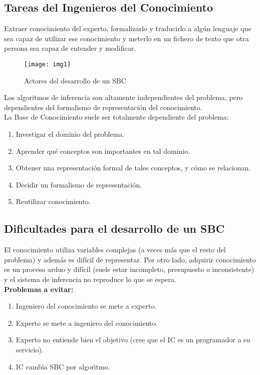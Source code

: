 \documentclass[12pt]{article}
\begin{document}
\subsection{Tareas del Ingenieros del Conocimiento}
Extraer conocimiento del experto, formalizarlo y traducirlo a algún lenguaje que sea capaz de utilizar ese conocimiento y meterlo en un fichero de texto que otra persona sea capaz de entender y modificar.

\begin{figure}[H]
\centering
\texttt{[image: img1]}
\caption{Actores del desarrollo de un  SBC} \label{fig:img1}
\end{figure}

Los algoritmos de inferencia son altamente independientes del problema, pero dependientes del formalismo de representación del conocimiento.\\
La Base de Conocimiento suele ser totalmente dependiente del problema:
\begin{enumerate}
\item Investigar el dominio del problema.
\item Aprender qué conceptos son importantes en tal dominio.
\item Obtener una representación formal de tales conceptos, y cómo se relacionan.
\item Decidir un formalismo de representación.
\item Reutilizar conocimiento.
\end{enumerate}

\subsection{Dificultades para el desarrollo de un SBC}
El conocimiento utiliza variables complejas (a veces más que el resto del problema) y además es difícil de representar. Por otro lado, adquirir conocimiento es un proceso arduo y difícil (suele estar incompleto, presupuesto o inconsistente) y el sistema de inferencia no reproduce lo que se espera.\\

\textbf{Problemas a evitar:}
\begin{enumerate}
\item Ingeniero del conocimiento se mete a experto.
\item Experto se mete a ingeniero del conocimiento.
\item Experto no entiende bien el objetivo (cree que el IC es un programador a su servicio).
\item IC cambia SBC por algoritmo.
\end{enumerate}
\end{document}

